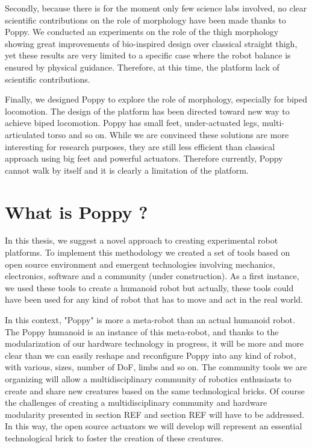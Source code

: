 Secondly, because there is for the moment only few science labs involved, no clear scientific contributions on the role of morphology have been made thanks to Poppy. We conducted an experiments on the role of the thigh morphology showing great improvements of bio-inspired design over classical straight thigh, yet these results are very limited to a specific case where the robot balance is ensured by physical guidance. Therefore, at this time, the platform lack of scientific contributions.

Finally, we designed Poppy to explore the role of morphology, especially for biped locomotion. The design of the platform has been directed toward new way to achieve biped locomotion. Poppy has small feet, under-actuated legs, multi-articulated torso and so on. While we are convinced these solutions are more interesting for research purposes, they are still less efficient than classical approach using big feet and powerful actuators.
Therefore currently, Poppy cannot walk by itself and it is clearly a limitation of the platform.


\section{What is Poppy ?} %
\label{sec:what_is_poppy}

In this thesis, we suggest a novel approach to creating experimental robot platforms. To implement this methodology we created a set of tools based on open source environment and emergent technologies involving mechanics, electronics, software and a community (under construction). As a first instance, we used these tools to create a humanoid robot but actually, these tools could have been used for any kind of robot that has to move and act in the real world.

In this context, "Poppy" is more a meta-robot than an actual humanoid robot. The Poppy humanoid is an instance of this meta-robot, and thanks to the modularization of our hardware technology in progress, it will be more and more clear than we can easily reshape and reconfigure Poppy into any kind of robot, with various, sizes, number of DoF, limbs and so on. The community tools we are organizing will allow a multidisciplinary community of robotics enthusiasts to create and share new creatures based on the same technological bricks. Of course the challenges of creating a multidisciplinary community and hardware modularity presented in section REF and section REF will have to be addressed. In this way, the open source actuators we will develop will represent an essential technological brick to foster the creation of these creatures.


